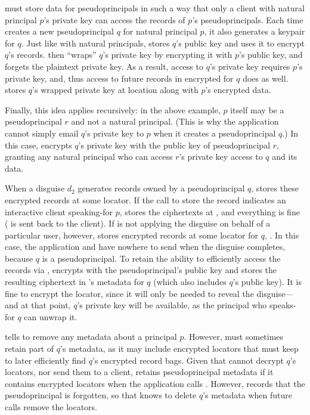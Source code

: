 %
\sys must store data for pseudoprincipals in such a way that only a client
with natural principal $p$'s private key can access the records of $p$'s
pseudoprincipals.
%
%
Each time \sys creates a new pseudoprincipal $q$ for natural principal $p$,
it also generates a keypair for $q$.
%
Just like with natural principals, \sys stores $q$'s public key and uses it
to encrypt $q$'s records.
%
\sys then ``wraps'' $q$'s private key by encrypting it with $p$'s public key,
and forgets the plaintext private key.
%
As a result, access to $q$'s private key requires $p$'s private key, and, thus
access to future records in \sys encrypted for $q$ does as well.
%
\sys stores $q$'s wrapped private key at location  along with
$p$'s encrypted data.
%

%
Finally, this idea applies recursively: in the above example, $p$ itself may
be a pseudoprincipal $r$ and not a natural principal.
%
(This is why the application cannot \eg simply email $q$'s private key to
$p$ when it creates a pseudoprincipal $q$.)
%
In this case, \sys encrypts $q$'s private key with the public key of
pseudoprincipal $r$, granting any natural principal who can access
$r$'s private key access to $q$ and its data.
%

%
When a disguise $d_2$ generates records owned by a pseudoprincipal $q$, \sys
stores these encrypted records at some locator.
%
If the call to store the record indicates an interactive client speaking-for $p$,
\sys stores the ciphertexts at , and everything is fine ( is sent back to the
client).
%
If \sys is not applying the disguise on behalf of a particular user, however, \sys stores encrypted records at some locator for $q$, .
%
In this case, the application and \sys have nowhere to send  when the disguise completes, because $q$ is a
pseudoprincipal.
%
To retain the ability to efficiently access the records via , \sys encrypts 
with the pseudoprincipal's public key and stores the resulting ciphertext in \sys's metadata for $q$
(which also includes $q$'s public key).
%
It is fine to encrypt the locator, since it will only be needed to reveal
the disguise---and at that point, $q$'s private key will be available,
as the principal who speaks-for $q$ can unwrap it.
%

%
 tells \sys to remove any metadata about a principal
$p$.
%
However, \sys must sometimes retain part of $q$'s metadata, as it may include
encrypted locators that \sys must keep to later efficiently find $q$'s
encrypted record bags.
%
Given that \sys cannot decrypt $q$'s locators, nor send them to a
client, \sys retains pseudoprincipal metadata if it contains encrypted locators
when the application calls .
%
However, \sys records that the pseudoprincipal is forgotten, so that \sys
knows to delete $q$'s metadata when future  calls remove
the locators.
%

